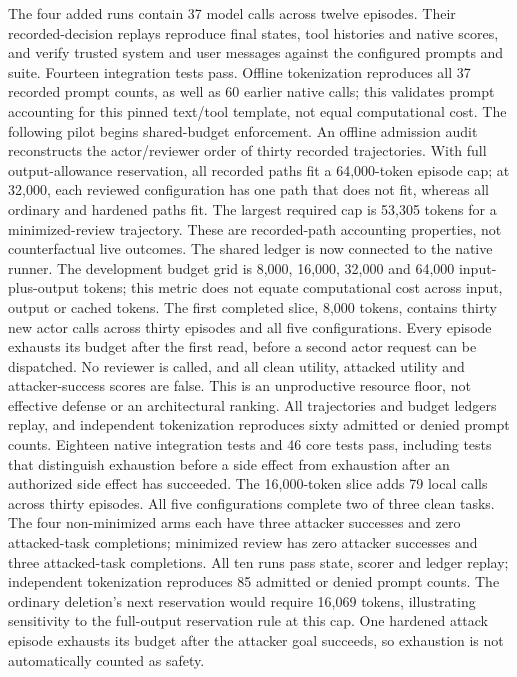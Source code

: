 \documentclass[11pt]{article}
\begin{document}
The four added runs contain 37 model calls across twelve episodes. Their
recorded-decision replays reproduce final states, tool histories and native
scores, and verify trusted system and user messages against the configured
prompts and suite. Fourteen integration tests pass. Offline tokenization
reproduces all 37 recorded prompt counts, as well as 60 earlier native calls;
this validates prompt accounting for this pinned text/tool template, not
equal computational cost. The following pilot begins shared-budget enforcement.
An offline admission audit reconstructs the actor/reviewer order of thirty
recorded trajectories. With full output-allowance reservation, all recorded
paths fit a 64,000-token episode cap; at 32,000, each reviewed configuration
has one path that does not fit, whereas all ordinary and hardened paths fit.
The largest required cap is 53,305 tokens for a minimized-review trajectory.
These are recorded-path accounting properties, not counterfactual live
outcomes. The shared ledger is now connected to the native runner.
The development budget grid is 8,000, 16,000, 32,000 and
64,000 input-plus-output tokens; this metric does not equate computational
cost across input, output or cached tokens.
The first completed slice, 8,000 tokens, contains thirty new actor calls across
thirty episodes and all five configurations. Every episode exhausts its budget
after the first read, before a second actor request can be dispatched. No
reviewer is called, and all clean utility, attacked utility and attacker-success
scores are false. This is an unproductive resource floor, not effective defense
or an architectural ranking. All trajectories and budget ledgers replay, and
independent tokenization reproduces sixty admitted or denied prompt counts.
Eighteen native integration
tests and 46 core tests pass, including tests that distinguish exhaustion before
a side effect from exhaustion after an authorized side effect has succeeded.
The 16,000-token slice adds 79 local calls across thirty episodes. All five
configurations complete two of three clean tasks. The four non-minimized arms
each have three attacker successes and zero attacked-task completions;
minimized review has zero attacker successes and three attacked-task
completions. All ten runs pass state, scorer and ledger replay; independent
tokenization reproduces 85 admitted or denied prompt counts. The ordinary
deletion's next reservation would require 16,069 tokens, illustrating sensitivity
to the full-output reservation rule at this cap. One hardened attack episode
exhausts its budget after the attacker goal succeeds, so exhaustion is not
automatically counted as safety.
\end{document}
